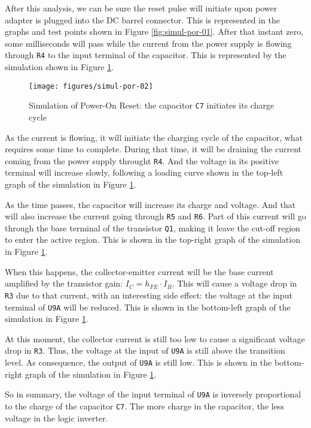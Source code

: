 After this analysis, we can be sure the reset pulse will initiate upon power adapter is plugged into the DC barrel connector. This is represented in the graphs and test points shown in Figure \ref{fig:simul-por-01}. After that instant zero, some milliseconds will pass while the current from the power supply is flowing through {\tt R4} to the input terminal of the capacitor. This is represented by the simulation shown in Figure \ref{fig:simul-por-02}.

\begin{figure}[htb]
  \centering
  \texttt{[image: figures/simul-por-02]}
  \caption{Simulation of Power-On Reset: the capacitor {\tt C7} initiates its charge cycle}
  \label{fig:simul-por-02}
\end{figure}

As the current is flowing, it will initiate the charging cycle of the capacitor, what requires some time to complete. During that time, it will be draining the current coming from the power supply throught {\tt R4}. And the voltage in its positive terminal will increase slowly, following a loading curve shown in the top-left graph of the simulation in Figure \ref{fig:simul-por-02}.

As the time passes, the capacitor will increase its charge and voltage. And that will also increase the current going through {\tt R5} and {\tt R6}. Part of this current will go through the base terminal of the transistor {\tt Q1}, making it leave the cut-off region to enter the active region. This is shown in the top-right graph of the simulation in Figure \ref{fig:simul-por-02}.

When this happens, the collector-emitter current will be the base current amplified by the transistor gain: $I_C = h_{FE} \cdot I_B$. This will cause a voltage drop in {\tt R3} due to that current, with an interesting side effect: the voltage at the input terminal of {\tt U9A} will be reduced. This is shown in the bottom-left graph of the simulation in Figure \ref{fig:simul-por-02}.

At this moment, the collector current is still too low to cause a significant voltage drop in {\tt R3}. Thus, the voltage at the input of {\tt U9A} is still above the transition level. As consequence, the output of {\tt U9A} is still low. This is shown in the bottom-right graph of the simulation in Figure \ref{fig:simul-por-02}.

So in summary, the voltage of the input terminal of {\tt U9A} is inversely proportional to the charge of the capacitor {\tt C7}. The more charge in the capacitor, the less voltage in the logic inverter.

